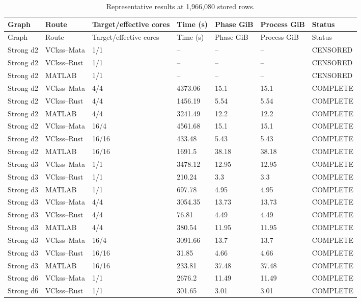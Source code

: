 \begingroup
\small
\setlength{\tabcolsep}{4pt}
\begin{longtable}{lllllll}
\caption{Representative results at 1,966,080 stored rows.}\label{tab:representative}\\
\toprule
Graph & Route & Target/effective cores & Time (s) & Phase GiB & Process GiB & Status \\
\midrule
\endfirsthead
\toprule
Graph & Route & Target/effective cores & Time (s) & Phase GiB & Process GiB & Status \\
\midrule
\endhead
Strong d2 & VCkss--Mata & 1/1 & -- & -- & -- & CENSORED \\
Strong d2 & VCkss--Rust & 1/1 & -- & -- & -- & CENSORED \\
Strong d2 & MATLAB & 1/1 & -- & -- & -- & CENSORED \\
Strong d2 & VCkss--Mata & 4/4 & 4373.06 & 15.1 & 15.1 & COMPLETE \\
Strong d2 & VCkss--Rust & 4/4 & 1456.19 & 5.54 & 5.54 & COMPLETE \\
Strong d2 & MATLAB & 4/4 & 3241.49 & 12.2 & 12.2 & COMPLETE \\
Strong d2 & VCkss--Mata & 16/4 & 4561.68 & 15.1 & 15.1 & COMPLETE \\
Strong d2 & VCkss--Rust & 16/16 & 433.48 & 5.43 & 5.43 & COMPLETE \\
Strong d2 & MATLAB & 16/16 & 1691.5 & 38.18 & 38.18 & COMPLETE \\
Strong d3 & VCkss--Mata & 1/1 & 3478.12 & 12.95 & 12.95 & COMPLETE \\
Strong d3 & VCkss--Rust & 1/1 & 210.24 & 3.3 & 3.3 & COMPLETE \\
Strong d3 & MATLAB & 1/1 & 697.78 & 4.95 & 4.95 & COMPLETE \\
Strong d3 & VCkss--Mata & 4/4 & 3054.35 & 13.73 & 13.73 & COMPLETE \\
Strong d3 & VCkss--Rust & 4/4 & 76.81 & 4.49 & 4.49 & COMPLETE \\
Strong d3 & MATLAB & 4/4 & 380.54 & 11.95 & 11.95 & COMPLETE \\
Strong d3 & VCkss--Mata & 16/4 & 3091.66 & 13.7 & 13.7 & COMPLETE \\
Strong d3 & VCkss--Rust & 16/16 & 31.85 & 4.66 & 4.66 & COMPLETE \\
Strong d3 & MATLAB & 16/16 & 233.81 & 37.48 & 37.48 & COMPLETE \\
Strong d6 & VCkss--Mata & 1/1 & 2676.2 & 11.49 & 11.49 & COMPLETE \\
Strong d6 & VCkss--Rust & 1/1 & 301.65 & 3.01 & 3.01 & COMPLETE \\

\end{longtable}
